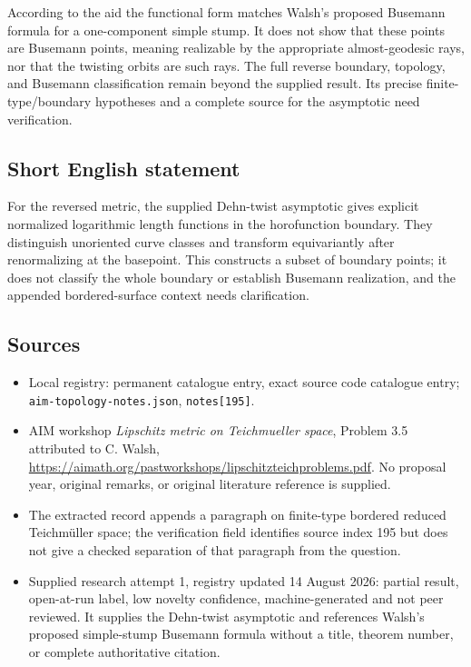 \documentclass[11pt]{article}
\begin{document}
According to the aid the functional form matches Walsh's proposed Busemann formula for a one-component simple stump. It does not show that these points are Busemann points, meaning realizable by the appropriate almost-geodesic rays, nor that the twisting orbits are such rays. The full reverse boundary, topology, and Busemann classification remain beyond the supplied result. Its precise finite-type/boundary hypotheses and a complete source for the asymptotic need verification.
\subsection{Short English statement}
For the reversed metric, the supplied Dehn-twist asymptotic gives explicit normalized logarithmic length functions in the horofunction boundary. They distinguish unoriented curve classes and transform equivariantly after renormalizing at the basepoint. This constructs a subset of boundary points; it does not classify the whole boundary or establish Busemann realization, and the appended bordered-surface context needs clarification.
\subsection{Sources}
\begin{itemize}
\item Local registry: permanent catalogue entry, exact source code catalogue entry; \texttt{aim-topology-notes.json}, \texttt{notes[195]}.
\item AIM workshop \emph{Lipschitz metric on Teichmueller space}, Problem 3.5 attributed to C. Walsh, \url{https://aimath.org/pastworkshops/lipschitzteichproblems.pdf}. No proposal year, original remarks, or original literature reference is supplied.
\item The extracted record appends a paragraph on finite-type bordered reduced Teichm\"uller space; the verification field identifies source index 195 but does not give a checked separation of that paragraph from the question.
\item Supplied research attempt 1, registry updated 14 August 2026: partial result, open-at-run label, low novelty confidence, machine-generated and not peer reviewed. It supplies the Dehn-twist asymptotic and references Walsh's proposed simple-stump Busemann formula without a title, theorem number, or complete authoritative citation.
\end{itemize}
\end{document}
